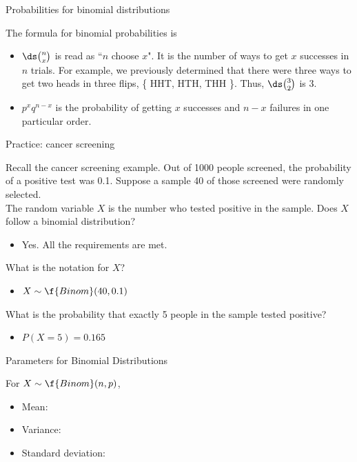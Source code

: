 \documentclass[xcolor=table, aspectratio=169, bigger, handout]{beamer}
\begin{document}
\begin{frame}{Probabilities for binomial distributions}
\begin{block}{}
The formula for binomial probabilities is\\ \smallskip
{}
\begin{itemize}
\pause\item $\ds \binom n x$ is read as ``$n$ choose $x$". It is the number of ways to get $x$ successes in $n$ trials. For example, we previously determined that there were three ways to get two heads in three flips, \{ HHT, HTH, THH \}. Thus, $\ds \binom 3 2$ is 3.
\pause\item $p^x q^{n-x}$ is the probability of getting $x$ successes and $n-x$ failures in one particular order.
\end{itemize}
\end{block}
\end{frame}


\begin{frame}{Practice: cancer screening}
\begin{block}{}
Recall the cancer screening example. Out of 1000 people screened, the probability of a positive test was 0.1. Suppose a sample 40 of those screened were randomly selected.\\
\medskip
\pause
The random variable $X$ is the number who tested positive in the sample. Does $X$ follow a binomial distribution?
\begin{itemize}
\pause\item Yes. All the requirements are met.
\end{itemize}
\medskip
\pause
What is the notation for $X$?
\begin{itemize}
\pause\item $X \sim \f{Binom}(40, 0.1)$
\end{itemize}
\medskip
\pause
What is the probability that exactly 5 people in the sample tested positive?
\begin{itemize}
\pause\item $P(X=5) = 0.165$
\end{itemize}
\end{block}
\end{frame}


\begin{frame}{Parameters for Binomial Distributions}
\begin{block}{}
For $X \sim \f{Binom}(n,p)$,
\begin{itemize}
\pause\item Mean:\\ \smallskip
{}
\pause\item Variance: \\ \smallskip
{}
\pause\item Standard deviation:\\ \smallskip
{}
\end{itemize}
\end{block}
\end{frame}
\end{document}
